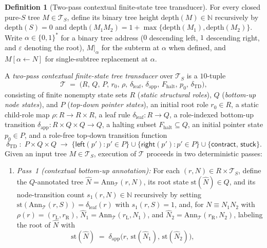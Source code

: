 \documentclass[11pt,reqno]{amsart}
\numberwithin{equation}{section}
\theoremstyle{plain}
\theoremstyle{definition}
\newtheorem{definition}[theorem]{Definition}
\theoremstyle{remark}
\newcommand{\TS}{\mathcal{T}_S}
\begin{document}
\begin{definition}[Two-pass contextual finite-state tree transducer]\label{def:pocket-transducer}
For every closed pure-$S$ tree $M \in \TS$, define its binary tree height $\mathrm{depth}(M) \in \mathbb{N}$ recursively by $\mathrm{depth}(S) = 0$ and $\mathrm{depth}(M_1 M_2) = 1 + \max\{\mathrm{depth}(M_1), \mathrm{depth}(M_2)\}$. Write $\alpha \in \{0,1\}^*$ for a binary tree address ($0$ descending left, $1$ descending right, and $\varepsilon$ denoting the root), $M|_{\alpha}$ for the subterm at $\alpha$ when defined, and $M[\alpha \leftarrow N]$ for single-subtree replacement at $\alpha$.

A \emph{two-pass contextual finite-state tree transducer} over $\TS$ is a $10$-tuple
\[
  \mathcal{T} \;=\; \bigl(R,\, Q,\, P,\, r_0,\, \rho,\, \delta_{\mathrm{leaf}},\, \delta_{\mathrm{app}},\, F_{\mathrm{halt}},\, p_0,\, \delta_{\mathrm{TD}}\bigr),
\]
consisting of finite nonempty state sets $R$ (\emph{static structural roles}), $Q$ (\emph{bottom-up node states}), and $P$ (\emph{top-down pointer states}), an initial root role $r_0 \in R$, a static child-role map $\rho \colon R \to R \times R$, a leaf rule $\delta_{\mathrm{leaf}} \colon R \to Q$, a role-indexed bottom-up transition $\delta_{\mathrm{app}} \colon R \times Q \times Q \to Q$, a halting subset $F_{\mathrm{halt}} \subseteq Q$, an initial pointer state $p_0 \in P$, and a role-free top-down transition function
\[
  \delta_{\mathrm{TD}} \;\colon\; P \times Q \times Q \;\longrightarrow\; \{\mathsf{left}(p') : p' \in P\} \cup \{\mathsf{right}(p') : p' \in P\} \cup \{\mathsf{contract},\, \mathsf{stuck}\}.
\]
Given an input tree $M \in \TS$, execution of $\mathcal{T}$ proceeds in two deterministic passes:
\begin{enumerate}[label=(\roman*),leftmargin=2.2em]
  \item \emph{Pass~1 (contextual bottom-up annotation):} For each $(r, N) \in R \times \TS$, define the $Q$-annotated tree $\widehat{N} = \mathrm{Ann}_{\mathcal{T}}(r, N)$, its root state $\mathrm{st}(\widehat{N}) \in Q$, and its node-transition count $s_1(r, N) \in \mathbb{N}$ recursively by setting $\mathrm{st}(\mathrm{Ann}_{\mathcal{T}}(r, S)) = \delta_{\mathrm{leaf}}(r)$ with $s_1(r, S) = 1$, and, for $N \equiv N_1 N_2$ with $\rho(r) = (r_{\mathrm{L}}, r_{\mathrm{R}})$, $\widehat{N}_1 = \mathrm{Ann}_{\mathcal{T}}(r_{\mathrm{L}}, N_1)$, and $\widehat{N}_2 = \mathrm{Ann}_{\mathcal{T}}(r_{\mathrm{R}}, N_2)$, labeling the root of $\widehat{N}$ with
  \[
    \mathrm{st}(\widehat{N}) \;=\; \delta_{\mathrm{app}}\bigl(r,\, \mathrm{st}(\widehat{N}_1),\, \mathrm{st}(\widehat{N}_2)\bigr), \qquad
\]
\end{enumerate}
\end{definition}
\end{document}
